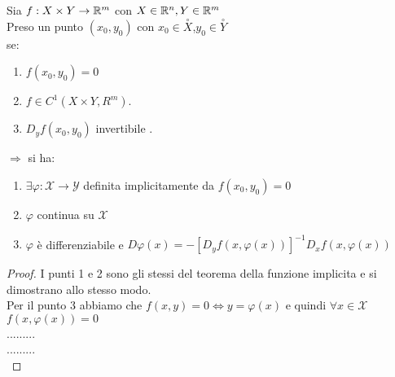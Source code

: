 \proposition
Sia $f:X\times Y\rightarrow \mathbb{R}^m$ con $X\in \mathbb{R}^n, Y\in \mathbb{R}^m$\\
Preso un punto $(x_0,y_0)$ con $x_0\in \overset{\circ}{X}$,$y_0\in \overset{\circ}{Y}$\\
se:
\begin{enumerate}
	\item $f(x_0,y_0)=0$
	\item $f\in C^1(X\times Y,R^m)$.
	\item $D_yf(x_0,y_0)$ invertibile .
\end{enumerate}
$\Rightarrow $ si ha:\\
\begin{enumerate}
	\item $\exists \varphi: \mathcal{X}\rightarrow\mathcal{Y}$ definita implicitamente da $f(x_0,y_0)=0$
	\item $\varphi$ continua su $\mathcal{X}$
	\item $\varphi$ è differenziabile e $D\varphi(x)=-[D_yf(x,\varphi(x))]^{-1}D_xf(x,\varphi(x))$
\end{enumerate}
\begin{proof}
	I punti 1 e 2 sono gli stessi del teorema della funzione implicita e si dimostrano allo stesso modo.\\
	Per il punto 3 abbiamo che $f(x,y)=0\Leftrightarrow y=\varphi(x)$ e quindi $\forall x\in \mathcal{X}$ $f(x,\varphi(x))=0$\\
	.........\\
	.........\\
	
\end{proof}

